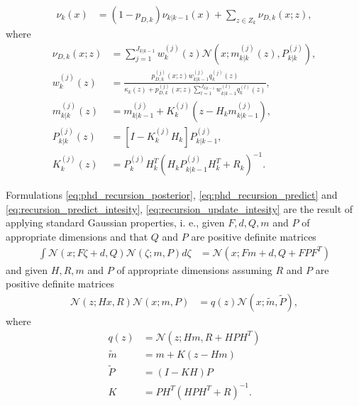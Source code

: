 \begin{align}
    \nu_{k}(x) &= (1-p_{D,k}) \nu_{k|k-1}(x) + \sum_{z\in Z_k}\nu_{D,k}(x;z), \label{eq:recursion_update_intesity}
\end{align}
where
\begin{align}
    \nu_{D,k}(x;z) &= \sum_{j=1}^{J_{k|k-1}} w_k^{(j)}(z) \mathcal{N}(x;m_{k|k}^{(j)}(z),P_{k|k}^{(j)}), \label{eq:recursion_update_intesity_detect} \\
    w_k^{(j)}(z) &= \frac{p_{D,k}^{(j)}(x;z) w_{k|k-1}^{(j)} q_k^{(j)}(z) }{\kappa_k(z) + p_{D,k}^{(j)}(x;z) \sum_{l=1}^{J_{k|k-1}} w_{k|k-1}^{(l)} q_k^{(l)}(z)}, \label{eq:recursion_update_intesity_detect_w} \\
    m_{k|k}^{(j)}(z) &= m_{k|k-1}^{(j)} + K_k^{(j)}(z-H_k m_{k|k-1}^{(j)}), \label{eq:recursion_update_intesity_detect_m} \\
    P_{k|k}^{(j)}(z) &= [I - K_k^{(j)} H_k] P_{k|k-1}^{(j)},  \label{eq:recursion_update_intesity_detect_P} \\
    K_{k}^{(j)}(z) &= P_{k}^{(j)} H_k^T(H_k P_{k|k-1}^{(j)} H_k^T + R_k)^{-1}. \label{eq:recursion_update_intesity_detect_K}
\end{align}

Formulations \eqref{eq:phd_recursion_posterior}, \eqref{eq:phd_recursion_predict} and \eqref{eq:recursion_predict_intesity}, \eqref{eq:recursion_update_intesity} are the result of applying standard Gaussian properties, i. e., given $F, d, Q, m$ and $P$ of appropriate dimensions and that $Q$ and $P$ are positive definite matrices
\begin{align}
    \int \mathcal{N}(x; F\zeta + d, Q) \mathcal{N}(\zeta; m, P) d\zeta &= \mathcal{N}(x; Fm + d, Q + FPF^T)
\end{align}
and given $H, R, m$ and $P$ of appropriate dimensions assuming $R$ and $P$ are positive definite matrices
\begin{align}
    \mathcal{N}(z; Hx, R) \mathcal{N}(x;m,P) &= q(z)\mathcal{N}(x; \tilde{m}, \tilde{P}),
\end{align}
where
\begin{align}
    q(z) &= \mathcal{N}(z; Hm, R + HPH^T) \\
    \tilde{m} &= m + K(z - Hm) \\
    \tilde{P} &= (I - KH)P \\
    K &= PH^T(HPH^T + R)^{-1}.
\end{align}



